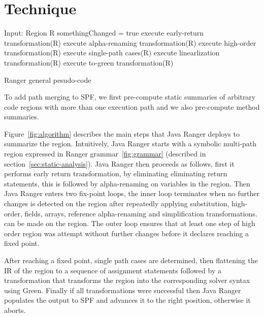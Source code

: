 \section{Technique}
%

\begin{algorithm}[]
\SetAlgoLined
Input: Region R\;
 somethingChanged = true\;
 execute early-return transformation(R)\;
 execute alpha-renaming transformation(R)\;
 {
	execute high-order transformation(R)\;}
	execute single-path cases(R)\;
	execute linearlization transformation(R)\;
	execute to-green transformation(R)\;
 \label{fig:algorithm}
  \caption{Ranger general pesudo-code}
\end{algorithm}

%
To add path merging to SPF, we first pre-compute static summaries of arbitrary code regions with more than one execution
path and we also pre-compute method summaries. 

Figure~\ref{fig:algorithm} describes the main steps that Java Ranger deploys to summarize the region. Intuitively, Java Ranger starts with a symbolic multi-path region expressed in Ranger grammar~\ref{fig:grammar} (described in section~\ref{sec:static-analysis}). Java Ranger then proceeds as follows, first it performs early return transformation, by eliminating eliminating return statements, this is followed by alpha-renaming on variables in the region. Then Java Ranger enters two fix-point loops, the inner loop terminates when no further changes is detected on the region after repeatedly applying substitution, high-order, fields, arrays, reference alpha-renaming and simplification transformations. can be made on the region. The outer loop ensures that at least one step of high order region was attempt without further changes before it declares reaching a fixed point. 

After reaching a fixed point, single path cases are determined, then flattening the IR of the region to a sequence of assignment statements followed by a transformation that transforms the region into the corresponding solver syntax using Green. Finally if all transformations were successful then Java Ranger populates the output to SPF and advances it to the right position, otherwise it aborts. 

